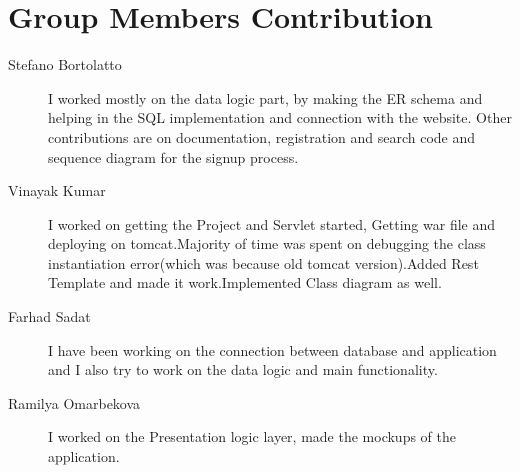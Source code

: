 \section{Group Members Contribution}


\begin{description}
	\item[Stefano Bortolatto] I worked mostly on the data logic part, by making the ER schema and helping in the SQL implementation and connection with the website. Other contributions are on documentation, registration and search code and sequence diagram for the signup process.
	\item[Vinayak Kumar] I worked on getting the Project and Servlet started, Getting war file  and deploying on tomcat.Majority of time was spent on debugging the class instantiation error(which was because old tomcat version).Added Rest Template and made it work.Implemented Class diagram as well.
	\item[Farhad Sadat] I have been working on the connection between database and application and I also try to work on the data logic and main functionality.
	\item[Ramilya Omarbekova] I worked on the Presentation logic layer, made the mockups of the application.

\end{description}
